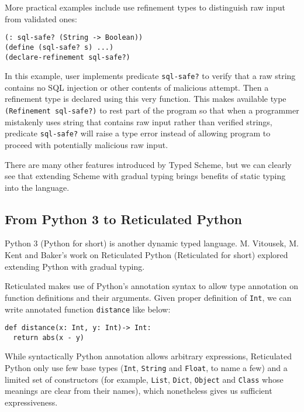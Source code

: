 More practical examples include use refinement types to distinguish raw input
from validated ones:

\begin{verbatim}
(: sql-safe? (String -> Boolean))
(define (sql-safe? s) ...)
(declare-refinement sql-safe?)
\end{verbatim}

In this example, user implements predicate \texttt{sql-safe?} to verify
that a raw string contains no SQL injection or other contents of malicious attempt.
Then a refinement type is declared using this very function.
This makes available type \texttt{(Refinement sql-safe?)} to rest part of the program
so that when a programmer mistakenly uses string that contains raw input rather than verified strings,
predicate \texttt{sql-safe?} will raise a type error instead of allowing program to proceed
with potentially malicious raw input.

There are many other features introduced by Typed Scheme,
but we can clearly see that extending Scheme with gradual typing
brings benefits of static typing into the language.

\subsection{From Python 3 to Reticulated Python}

Python 3 (Python for short) is another dynamic typed language.
M. Vitousek, M. Kent and Baker's work on Reticulated Python\cite{vitousek2014design}
(Reticulated for short)
explored extending Python with gradual typing.

Reticulated makes use of Python's annotation syntax\cite{pep3107}
to allow type annotation on function definitions and their arguments.
Given proper definition of \texttt{Int}, we can write annotated
function \texttt{distance} like below:

\begin{verbatim}
def distance(x: Int, y: Int)-> Int:
  return abs(x - y)
\end{verbatim}

While syntactically Python annotation allows arbitrary expressions,
Reticulated Python only use few base types (\texttt{Int}, \texttt{String} and \texttt{Float}, to name a few)
and a limited set of constructors
(for example, \texttt{List}, \texttt{Dict}, \texttt{Object} and \texttt{Class} whose meanings are clear
from their names),
which nonetheless gives us sufficient expressiveness.

